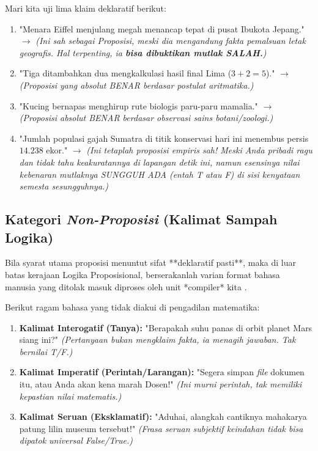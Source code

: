 \begin{contoh}
Mari kita uji lima klaim deklaratif berikut:
\begin{enumerate}
    \item "Menara Eiffel menjulang megah menancap tepat di pusat Ibukota Jepang." $\rightarrow$ \textit{(Ini sah sebagai Proposisi, meski dia mengandung fakta pemalsuan letak geografis. Hal terpenting, ia \textbf{bisa dibuktikan mutlak SALAH.})}
    \item "Tiga ditambahkan dua mengkalkulasi hasil final Lima ($3 + 2 = 5$)." $\rightarrow$ \textit{(Proposisi yang absolut BENAR berdasar postulat aritmatika.)}
    \item "Kucing bernapas menghirup rute biologis paru-paru mamalia." $\rightarrow$ \textit{(Proposisi absolut BENAR berdasar observasi sains botani/zoologi.)}
    \item "Jumlah populasi gajah Sumatra di titik konservasi hari ini menembus persis $14.238$ ekor." $\rightarrow$ \textit{(Ini tetaplah proposisi empiris sah! Meski Anda pribadi ragu dan tidak tahu keakuratannya di lapangan detik ini, namun esensinya nilai kebenaran mutlaknya SUNGGUH ADA (entah T atau F) di sisi kenyataan semesta sesungguhnya.)}
\end{enumerate}
\end{contoh}

\subsection{Kategori \textit{Non-Proposisi} (Kalimat Sampah Logika)}

Bila syarat utama proposisi menuntut sifat **deklaratif pasti**, maka di luar batas kerajaan Logika Proposisional, berserakanlah varian format bahasa manusia yang ditolak masuk diproses oleh unit *compiler* kita \cite{wiki_first_order_logic}.

\begin{contoh}
Berikut ragam bahasa yang tidak diakui di pengadilan matematika:
\begin{enumerate}
    \item \textbf{Kalimat Interogatif (Tanya):} "Berapakah suhu panas di orbit planet Mars siang ini?" \textit{(Pertanyaan bukan mengklaim fakta, ia menagih jawaban. Tak bernilai T/F.)}
    \item \textbf{Kalimat Imperatif (Perintah/Larangan):} "Segera simpan \textit{file} dokumen itu, atau Anda akan kena marah Dosen!" \textit{(Ini murni perintah, tak memiliki kepastian nilai matematis.)}
    \item \textbf{Kalimat Seruan (Eksklamatif):} "Aduhai, alangkah cantiknya mahakarya patung lilin museum tersebut!" \textit{(Frasa seruan subjektif keindahan tidak bisa dipatok universal False/True.)}
\end{enumerate}
\end{contoh}

